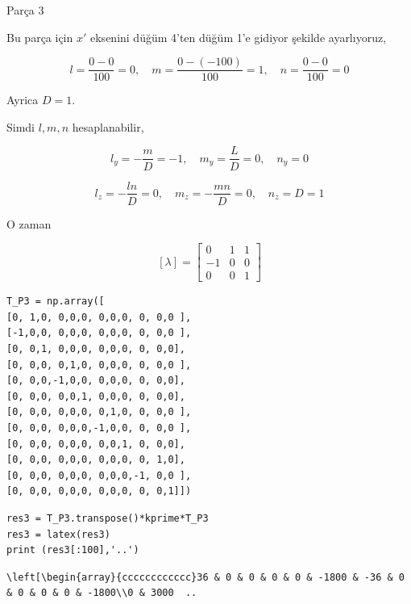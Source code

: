 \documentclass[12pt,fleqn]{article}\usepackage{../../common}
\begin{document}
Parça 3

Bu parça için $x'$ eksenini düğüm 4'ten düğüm 1'e gidiyor şekilde ayarlıyoruz,

$$
l = \frac{0 - 0}{100} = 0, \quad
m = \frac{0 - (-100)}{100} = 1, \quad
n = \frac{0 - 0}{100} = 0
$$

Ayrica $D = 1$.

Simdi $l,m,n$ hesaplanabilir,

$$
l_y = - \frac{m}{D} = -1, \quad
m_y = \frac{L}{D} = 0, \quad
n_y = 0
$$

$$
l_z = - \frac{ln}{D} = 0, \quad
m_z = - \frac{mn}{D} = 0, \quad
n_z = D = 1
$$

O zaman

$$
[ \lambda ] = \left[\begin{array}{rrr}
0 & 1 & 1 \\ -1 & 0 & 0 \\ 0 & 0 & 1
\end{array}\right]
$$

\begin{verbatim}
T_P3 = np.array([
[0, 1,0, 0,0,0, 0,0,0, 0, 0,0 ],
[-1,0,0, 0,0,0, 0,0,0, 0, 0,0 ],
[0, 0,1, 0,0,0, 0,0,0, 0, 0,0],
[0, 0,0, 0,1,0, 0,0,0, 0, 0,0 ],
[0, 0,0,-1,0,0, 0,0,0, 0, 0,0],
[0, 0,0, 0,0,1, 0,0,0, 0, 0,0],
[0, 0,0, 0,0,0, 0,1,0, 0, 0,0 ],
[0, 0,0, 0,0,0,-1,0,0, 0, 0,0 ],
[0, 0,0, 0,0,0, 0,0,1, 0, 0,0],
[0, 0,0, 0,0,0, 0,0,0, 0, 1,0],
[0, 0,0, 0,0,0, 0,0,0,-1, 0,0 ],
[0, 0,0, 0,0,0, 0,0,0, 0, 0,1]])
\end{verbatim}

\begin{verbatim}
res3 = T_P3.transpose()*kprime*T_P3
res3 = latex(res3)
print (res3[:100],'..')
\end{verbatim}

\begin{verbatim}
\left[\begin{array}{cccccccccccc}36 & 0 & 0 & 0 & 0 & -1800 & -36 & 0 & 0 & 0 & 0 & -1800\\0 & 3000  ..
\end{verbatim}
\end{document}
